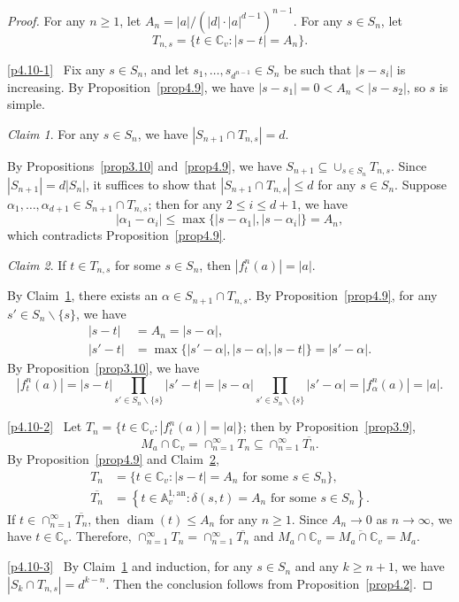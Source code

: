 \documentclass[11pt]{amsart}
\numberwithin{equation}{section}
\theoremstyle{plain}
\theoremstyle{definition}
\theoremstyle{remark}
\newtheorem{claim}{Claim}
\DeclareMathOperator{\diam}{diam}
\newcommand{\A}{\mathbb A}
\newcommand{\C}{\mathbb C}
\newcommand{\an}{\mathrm{an}}
\begin{document}
\begin{proof}
For any $n\geq1$, let $A_{n}=|a|/(|d|\cdot|a|^{d-1})^{n-1}$. For any
$s\in S_{n}$, let
\[
T_{n,s}=\{t\in\C_{v}:|s-t|=A_{n}\}.
\]

\eqref{p4.10-1}~
 Fix any $s\in S_{n}$, and let $s_{1},\dots,s_{d^{n-1}}\in S_{n}$
be such that $|s-s_{i}|$ is increasing. By Proposition~\ref{prop4.9},
we have $|s-s_{1}|=0<A_{n}<|s-s_{2}|$, so $s$ is simple.

\begin{claim}\label{claim1}
For any $s\in S_{n}$, we have $|S_{n+1}\cap T_{n,s}|=d$.
\end{claim}

By Propositions~\ref{prop3.10} and~\ref{prop4.9}, we have
$S_{n+1}\subseteq\cup_{s\in S_{n}}T_{n,s}$.  Since
$|S_{n+1}|=d|S_{n}|$, it suffices to show that $|S_{n+1}\cap
T_{n,s}|\leq d$ for any $s\in S_{n}$. Suppose
$\alpha_{1},\dots,\alpha_{d+1}\in S_{n+1}\cap T_{n,s}$; then for any
$2\leq i\leq d+1$, we have
\[
|\alpha_{1}-\alpha_{i}|\leq\max\{|s-\alpha_{1}|,|s-\alpha_{i}|\}=A_{n},
\]
which contradicts Proposition~\ref{prop4.9}.

\begin{claim}\label{claim2}
If $t\in T_{n,s}$ for some $s\in S_{n}$, then
$|f_{t}^{n}(a)|=|a|$.
\end{claim}

By Claim~\ref{claim1}, there exists an $\alpha\in S_{n+1}\cap T_{n,s}$. By Proposition~\ref{prop4.9}, for any $s'\in S_{n}\backslash\{s\}$, we have
\begin{align*}
|s-t| & =A_{n}=|s-\alpha|,\\
|s'-t| & =\max\{|s'-\alpha|,|s-\alpha|,|s-t|\}=|s'-\alpha|.
\end{align*}
By Proposition~\ref{prop3.10}, we have
\[
|f_{t}^{n}(a)|=|s-t|\prod_{s'\in S_{n}\backslash\{s\}}|s'-t|=|s-\alpha|\prod_{s'\in S_{n}\backslash\{s\}}|s'-\alpha|=|f_{\alpha}^{n}(a)|=|a|.
\]

\eqref{p4.10-2}~ Let $T_{n}=\{t\in\C_{v}:|f_{t}^{n}(a)|=|a|\}$; then by
Proposition~\ref{prop3.9},
\[
M_{a}\cap\C_{v}=\cap_{n=1}^{\infty}T_{n}\subseteq\cap_{n=1}^{\infty}\overline{T_{n}}.
\]
By Proposition~\ref{prop4.9} and Claim~\ref{claim2},
\begin{align*}
T_{n} & =\{t\in\C_{v}:|s-t|=A_{n}\text{ for some }s\in S_{n}\},\\
\overline{T_{n}}& =\left\{t\in\A_{v}^{1,\an}:\delta(s,t)=A_{n}\text{ for some }s\in S_{n}\right\}.
\end{align*}
If $t\in\cap_{n=1}^{\infty}\overline{T_{n}}$, then $\diam(t)\leq A_{n}$
for any $n\geq1$. Since $A_{n}\to0$ as $n\to\infty$, we have $t\in\C_{v}$.
Therefore, $\cap_{n=1}^{\infty}T_{n}=\cap_{n=1}^{\infty}\overline{T_{n}}$
and $M_{a}\cap\C_{v}=\overline{M_{a}\cap\C_{v}}=M_{a}$.

\eqref{p4.10-3}~
 By Claim~\ref{claim1} and induction, for any $s\in S_{n}$ and any $k\geq n+1$,
we have $|S_{k}\cap T_{n,s}|=d^{k-n}$. Then the conclusion follows
from Proposition~\ref{prop4.2}.
\end{proof}
\end{document}
